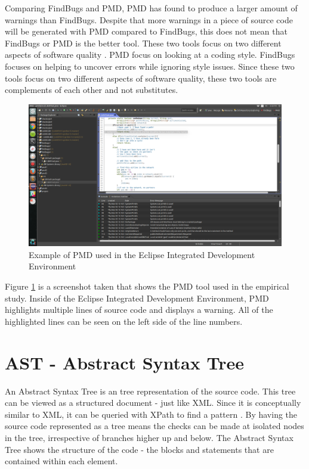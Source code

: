 Comparing FindBugs and PMD, PMD has found to produce a larger amount of warnings than FindBugs. Despite that more warnings in a piece of source code will be generated with PMD compared to FindBugs, this does not mean that FindBugs or PMD is the better tool. These two tools focus on two different aspects of software quality \cite{Hovemeyer:2004:FBE:1028664.1028717}. PMD focus on looking at a coding style. FindBugs focuses on helping to uncover errors while ignoring style issues. Since these two tools focus on two different aspects of software quality, these two tools are complements of each other and not substitutes.

\newpage
\begin{figure}
\begin{center}
\includegraphics[width=1.15\textwidth]{pmd.png}
\end{center}
\caption{Example of PMD used in the Eclipse Integrated Development Environment}
\label{fig:pmd}
\end{figure}
Figure \ref{fig:pmd} is a screenshot taken that shows the PMD tool used in the empirical study. Inside of the Eclipse Integrated Development Environment, PMD highlights multiple lines of source code and displays a warning. All of the highlighted lines can be seen on the left side of the line numbers.   

\section{AST - Abstract Syntax Tree}
\label{sec:ast}

An Abstract Syntax Tree is an tree representation of the source code. This tree can be viewed as a structured document - just like XML. Since it is  conceptually similar to XML, it can be queried with XPath to find a pattern \cite{pmd}. By having the source code represented as a tree means the checks can be made at isolated nodes in the tree, irrespective of branches higher up and below. The Abstract Syntax Tree shows the structure of the code - the blocks and statements that are contained within each element.

